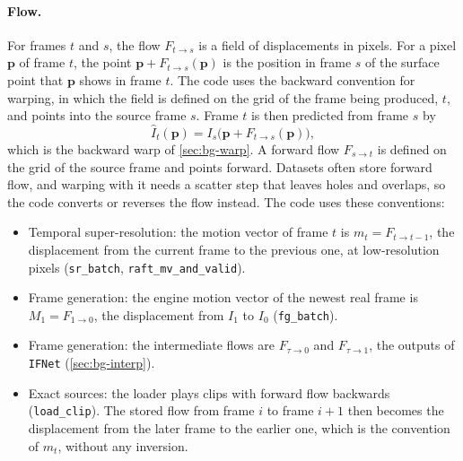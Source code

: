 \paragraph{Flow.} For frames $t$ and $s$, the flow $F_{t\to s}$ is a field of displacements in pixels. For a pixel $\mathbf p$ of frame $t$, the point $\mathbf p+F_{t\to s}(\mathbf p)$ is the position in frame $s$ of the surface point that $\mathbf p$ shows in frame $t$. The code uses the backward convention for warping, in which the field is defined on the grid of the frame being produced, $t$, and points into the source frame $s$. Frame $t$ is then predicted from frame $s$ by
\begin{equation}
\hat I_t(\mathbf p)=I_s\big(\mathbf p+F_{t\to s}(\mathbf p)\big),\label{eq:bg-flow}
\end{equation}
which is the backward warp of \cref{sec:bg-warp}. A forward flow $F_{s\to t}$ is defined on the grid of the source frame and points forward. Datasets often store forward flow, and warping with it needs a scatter step that leaves holes and overlaps, so the code converts or reverses the flow instead. The code uses these conventions:
\begin{itemize}
\item Temporal super-resolution: the motion vector of frame $t$ is $m_t=F_{t\to t-1}$, the displacement from the current frame to the previous one, at low-resolution pixels (\texttt{sr\_batch}, \texttt{raft\_mv\_and\_valid}).
\item Frame generation: the engine motion vector of the newest real frame is $M_1=F_{1\to0}$, the displacement from $I_1$ to $I_0$ (\texttt{fg\_batch}).
\item Frame generation: the intermediate flows are $F_{\tau\to0}$ and $F_{\tau\to1}$, the outputs of \texttt{IFNet} (\cref{sec:bg-interp}).
\item Exact sources: the loader plays clips with forward flow backwards (\texttt{load\_clip}). The stored flow from frame $i$ to frame $i+1$ then becomes the displacement from the later frame to the earlier one, which is the convention of $m_t$, without any inversion.
\end{itemize}

